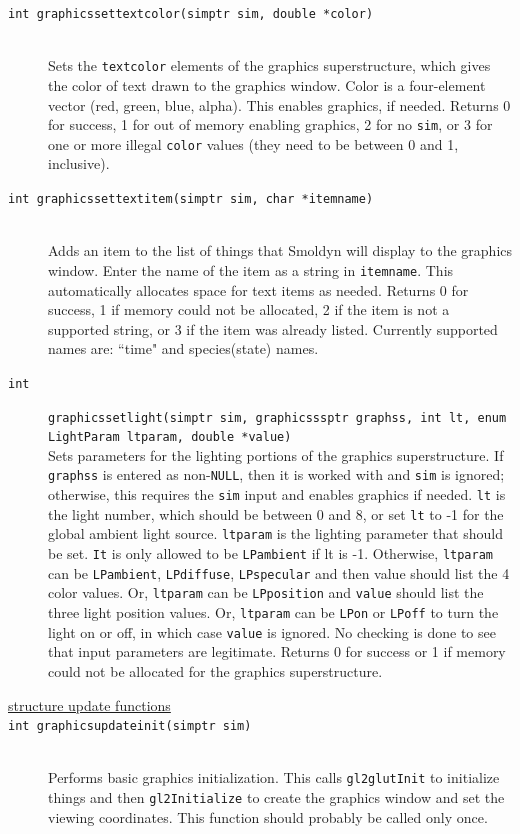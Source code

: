 \documentclass {scrbook}
\newcommand {\ttt} {\texttt}
\begin{document}
\begin{description}
\item[\ttt{int graphicssettextcolor(simptr sim, double *color)}]
\hfill \\
Sets the \ttt{textcolor} elements of the graphics superstructure, which gives the color of text drawn to the graphics window. Color is a four-element vector (red, green, blue, alpha). This enables graphics, if needed. Returns 0 for success, 1 for out of memory enabling graphics, 2 for no \ttt{sim}, or 3 for one or more illegal \ttt{color} values (they need to be between 0 and 1, inclusive).

\item[\ttt{int graphicssettextitem(simptr sim, char *itemname)}]
\hfill \\
Adds an item to the list of things that Smoldyn will display to the graphics window. Enter the name of the item as a string in \ttt{itemname}. This automatically allocates space for text items as needed. Returns 0 for success, 1 if memory could not be allocated, 2 if the item is not a supported string, or 3 if the item was already listed. Currently supported names are: ``time" and species(state) names.

\item[\ttt{int}]
\ttt{graphicssetlight(simptr sim, graphicsssptr graphss, int lt, enum LightParam ltparam, double *value)}
\hfill \\
Sets parameters for the lighting portions of the graphics superstructure. If \ttt{graphss} is entered as non-\ttt{NULL}, then it is worked with and \ttt{sim} is ignored; otherwise, this requires the \ttt{sim} input and enables graphics if needed. \ttt{lt} is the light number, which should be between 0 and 8, or set \ttt{lt} to -1 for the global ambient light source. \ttt{ltparam} is the lighting parameter that should be set. \ttt{It} is only allowed to be \ttt{LPambient} if lt is -1. Otherwise, \ttt{ltparam} can be \ttt{LPambient}, \ttt{LPdiffuse}, \ttt{LPspecular} and then value should list the 4 color values. Or, \ttt{ltparam} can be \ttt{LPposition} and \ttt{value} should list the three light position values. Or, \ttt{ltparam} can be \ttt{LPon} or \ttt{LPoff} to turn the light on or off, in which case \ttt{value} is ignored. No checking is done to see that input parameters are legitimate. Returns 0 for success or 1 if memory could not be allocated for the graphics superstructure.

\item[\underline{structure update functions}]

\item[\ttt{int graphicsupdateinit(simptr sim)}]
\hfill \\
Performs basic graphics initialization. This calls \ttt{gl2glutInit} to initialize things and then \ttt{gl2Initialize} to create the graphics window and set the viewing coordinates. This function should probably be called only once.


\end{description}
\end{document}
